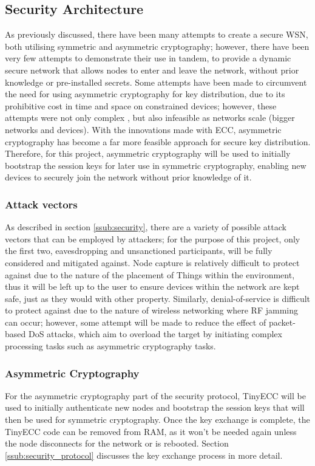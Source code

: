 \documentclass{mprop}
\begin{document}
\subsection{Security Architecture} %
\label{sub:security_architecture}
As previously discussed, there have been many attempts to create a secure WSN, both utilising symmetric and asymmetric cryptography; however, there have been very few attempts to demonstrate their use in tandem, to provide a dynamic secure network that allows nodes to enter and leave the network, without prior knowledge or pre-installed secrets. Some attempts have been made to circumvent the need for using asymmetric cryptography for key distribution, due to its prohibitive cost in time and space on constrained devices; however, these attempts were not only complex \cite{TinyPK}, but also infeasible as networks scale (bigger networks and devices)\cite{MessageBottle}. With the innovations made with ECC, asymmetric cryptography has become a far more feasible approach for secure key distribution. Therefore, for this project, asymmetric cryptography will be used to initially bootstrap the session keys for later use in symmetric cryptography, enabling new devices to securely join the network without prior knowledge of it.

\subsubsection{Attack vectors} %
\label{ssub:attack_vectors}
As described in section \ref{ssub:security}, there are a variety of possible attack vectors that can be employed by attackers; for the purpose of this project, only the first two, eavesdropping and unsanctioned participants, will be fully considered and mitigated against. Node capture is relatively difficult to protect against due to the nature of the placement of Things within the environment, thus it will be left up to the user to ensure devices within the network are kept safe, just as they would with other property. Similarly, denial-of-service is difficult to protect against due to the nature of wireless networking where RF jamming can occur; however, some attempt will be made to reduce the effect of packet-based DoS attacks, which aim to overload the target by initiating complex processing tasks such as asymmetric cryptography tasks. 


\subsubsection{Asymmetric Cryptography} %
\label{ssub:asymmetric_key_cryptography}
For the asymmetric cryptography part of the security protocol, TinyECC\cite{TinyECC} will be used to initially authenticate new nodes and bootstrap the session keys that will then be used for symmetric cryptography. Once the key exchange is complete, the TinyECC code can be removed from RAM, as it won't be needed again unless the node disconnects for the network or is rebooted. Section \ref{ssub:security_protocol} discusses the key exchange process in more detail.
\end{document}
